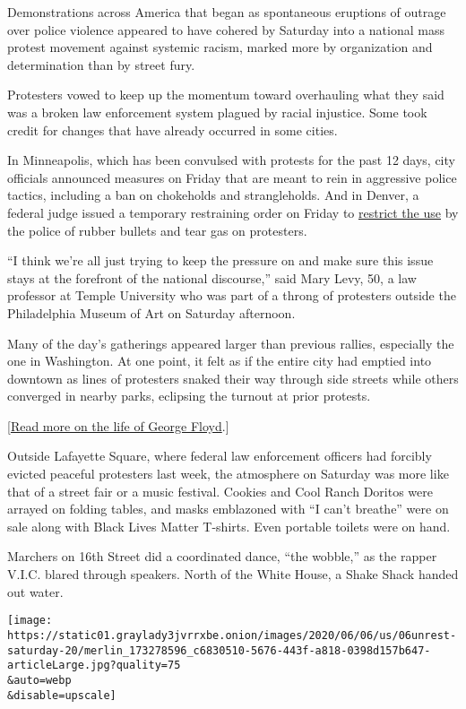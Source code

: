 Demonstrations across America that began as spontaneous eruptions of
outrage over police violence appeared to have cohered by Saturday into a
national mass protest movement against systemic racism, marked more by
organization and determination than by street fury.

Protesters vowed to keep up the momentum toward overhauling what they
said was a broken law enforcement system plagued by racial injustice.
Some took credit for changes that have already occurred in some cities.

In Minneapolis, which has been convulsed with protests for the past 12
days, city officials announced measures on Friday that are meant to rein
in aggressive police tactics, including a ban on chokeholds and
strangleholds. And in Denver, a federal judge issued a temporary
restraining order on Friday to
\href{https://www.denverpost.com/2020/06/05/federal-judge-orders-denver-police-stop-projectiles-protesters/}{restrict
the use} by the police of rubber bullets and tear gas on protesters.

``I think we're all just trying to keep the pressure on and make sure
this issue stays at the forefront of the national discourse,'' said Mary
Levy, 50, a law professor at Temple University who was part of a throng
of protesters outside the Philadelphia Museum of Art on Saturday
afternoon.

Many of the day's gatherings appeared larger than previous rallies,
especially the one in Washington. At one point, it felt as if the entire
city had emptied into downtown as lines of protesters snaked their way
through side streets while others converged in nearby parks, eclipsing
the turnout at prior protests.

{[}\href{https://www.nytimes3xbfgragh.onion/article/george-floyd-who-is.html}{Read
more on the life of George Floyd}.{]}

Outside Lafayette Square, where federal law enforcement officers had
forcibly evicted peaceful protesters last week, the atmosphere on
Saturday was more like that of a street fair or a music festival.
Cookies and Cool Ranch Doritos were arrayed on folding tables, and masks
emblazoned with ``I can't breathe'' were on sale along with Black Lives
Matter T-shirts. Even portable toilets were on hand.

Marchers on 16th Street did a coordinated dance, ``the wobble,'' as the
rapper V.I.C. blared through speakers. North of the White House, a Shake
Shack handed out water.

\texttt{[image: https://static01.graylady3jvrrxbe.onion/images/2020/06/06/us/06unrest-saturday-20/merlin\_173278596\_c6830510-5676-443f-a818-0398d157b647-articleLarge.jpg?quality=75\\\&auto=webp\\\&disable=upscale]}

